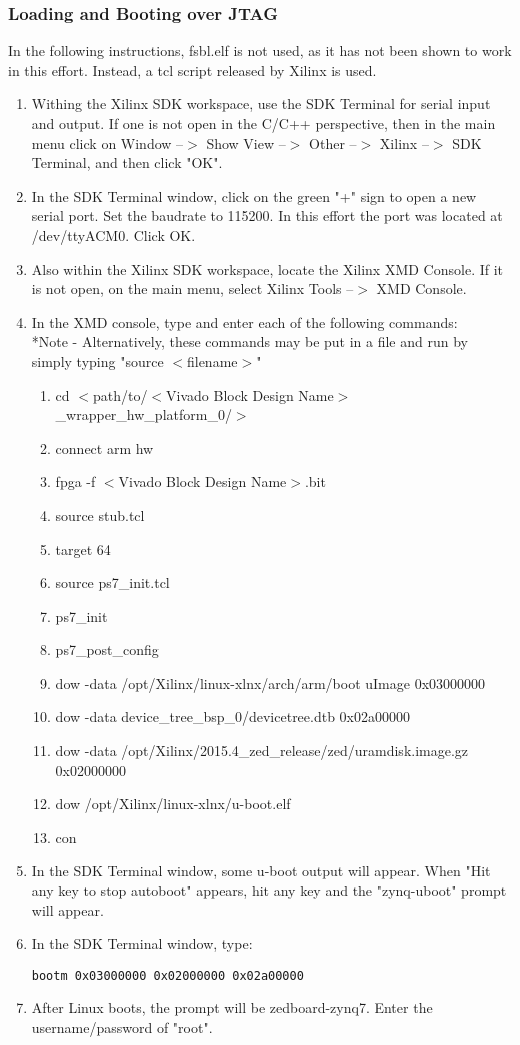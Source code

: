 \subsubsection{Loading and Booting over JTAG}
In the following instructions, fsbl.elf is not used, as it has not been shown to work in this effort.  Instead, a tcl script released by Xilinx is used.
\begin{enumerate}
\item Withing the Xilinx SDK workspace, use the SDK Terminal for serial input and output.  If one is not open in the C/C++ perspective, then in the main menu click on Window --$>$ Show View --$>$ Other --$>$ Xilinx --$>$ SDK Terminal, and then click "OK".
\item In the SDK Terminal window, click on the green "+" sign to open a new serial port.  Set the baudrate to 115200.  In this effort the port was located at /dev/ttyACM0.  Click OK.
\item Also within the Xilinx SDK workspace, locate the Xilinx XMD Console.  If it is not open, on the main menu, select Xilinx Tools --$>$ XMD Console.
\item In the XMD console, type and enter each of the following commands:
\\ *Note - Alternatively, these commands may be put in a file and run by simply typing "source $<$filename$>$"
\begin{enumerate}
\item cd $<$path/to/$<$Vivado Block Design Name$>$\_wrapper\_hw\_platform\_0/$>$
\item connect arm hw
\item fpga -f $<$Vivado Block Design Name$>$.bit
\item source stub.tcl
\item target 64
\item source ps7\_init.tcl
\item ps7\_init
\item ps7\_post\_config
\item dow -data /opt/Xilinx/linux-xlnx/arch/arm/boot uImage 0x03000000
\item dow -data device\_tree\_bsp\_0/devicetree.dtb 0x02a00000
\item dow -data /opt/Xilinx/2015.4\_zed\_release/zed/uramdisk.image.gz 0x02000000
\item dow /opt/Xilinx/linux-xlnx/u-boot.elf
\item con
\end{enumerate}
\item In the SDK Terminal window, some u-boot output will appear.  When "Hit any key to stop autoboot" appears, hit any key and the "zynq-uboot" prompt will appear.
\item In the SDK Terminal window, type:
\begin{lstlisting}
bootm 0x03000000 0x02000000 0x02a00000
\end{lstlisting}
\item After Linux boots, the prompt will be zedboard-zynq7.  Enter the username/password of "root".
\end{enumerate}
